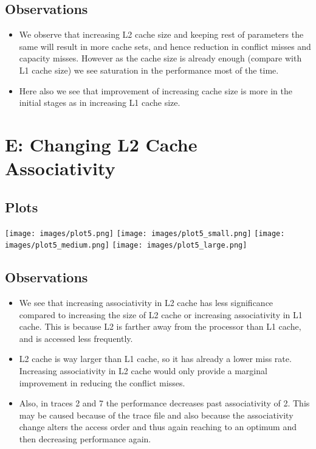 \documentclass[11pt]{scrartcl}
\begin{document}
\subsection{Observations}
\begin{itemize}
    \item We observe that increasing L2 cache size and keeping rest of parameters the same will result in more cache sets, and hence reduction in conflict misses and capacity misses. However as the cache size is already enough (compare with L1 cache size) we see saturation in the performance most of the time.
    \item Here also we see that improvement of increasing cache size is more in the initial stages as in increasing L1 cache size.
\end{itemize}

\newpage


\section{E: Changing L2 Cache Associativity}
\subsection{Plots}

\texttt{[image: images/plot5.png]}
\texttt{[image: images/plot5\_small.png]}
\texttt{[image: images/plot5\_medium.png]}
\texttt{[image: images/plot5\_large.png]}


\subsection{Observations}
\begin{itemize}
    \item We see that increasing associativity in L2 cache has less significance compared to increasing the size of L2 cache or increasing associativity in L1 cache. This is because L2 is farther away from the processor than L1 cache, and is accessed less frequently.
    \item L2 cache is way larger than L1 cache, so it has already a lower miss rate. Increasing associativity in L2 cache would only provide a marginal improvement in reducing the conflict misses. 
    \item Also, in traces 2 and 7 the performance decreases past associativity of 2. This may be caused because of the trace file and also because the associativity change alters the access order and thus again reaching to an optimum and then decreasing performance again.
\end{itemize}
\end{document}
